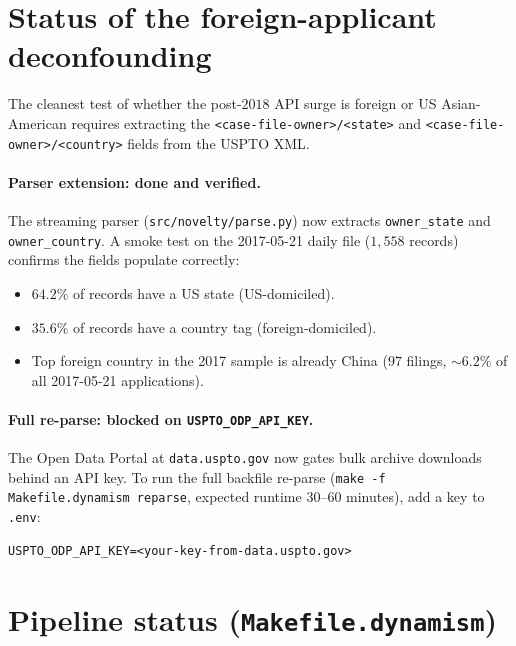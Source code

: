 \documentclass[11pt]{article}
\begin{document}
\section*{Status of the foreign-applicant deconfounding}

The cleanest test of whether the post-$2018$ API surge is foreign or
US Asian-American requires extracting the
\texttt{<case-file-owner>/<state>} and
\texttt{<case-file-owner>/<country>} fields from the USPTO XML.

\paragraph{Parser extension: done and verified.} The streaming parser
(\texttt{src/novelty/parse.py}) now extracts \texttt{owner\_state} and
\texttt{owner\_country}.  A smoke test on the 2017-05-21 daily file
($1{,}558$ records) confirms the fields populate correctly:
\begin{itemize}\setlength\itemsep{0pt}
\item $64.2\%$ of records have a US state (US-domiciled).
\item $35.6\%$ of records have a country tag (foreign-domiciled).
\item Top foreign country in the 2017 sample is already China
($97$ filings, $\sim 6.2\%$ of all 2017-05-21 applications).
\end{itemize}

\paragraph{Full re-parse: blocked on \texttt{USPTO\_ODP\_API\_KEY}.}
The Open Data Portal at \texttt{data.uspto.gov} now gates bulk
archive downloads behind an API key. To run the full backfile
re-parse (\texttt{make -f Makefile.dynamism reparse}, expected
runtime $30$--$60$ minutes), add a key to \texttt{.env}:
\begin{verbatim}
USPTO_ODP_API_KEY=<your-key-from-data.uspto.gov>
\end{verbatim}

\section*{Pipeline status (\texttt{Makefile.dynamism})}
\end{document}
